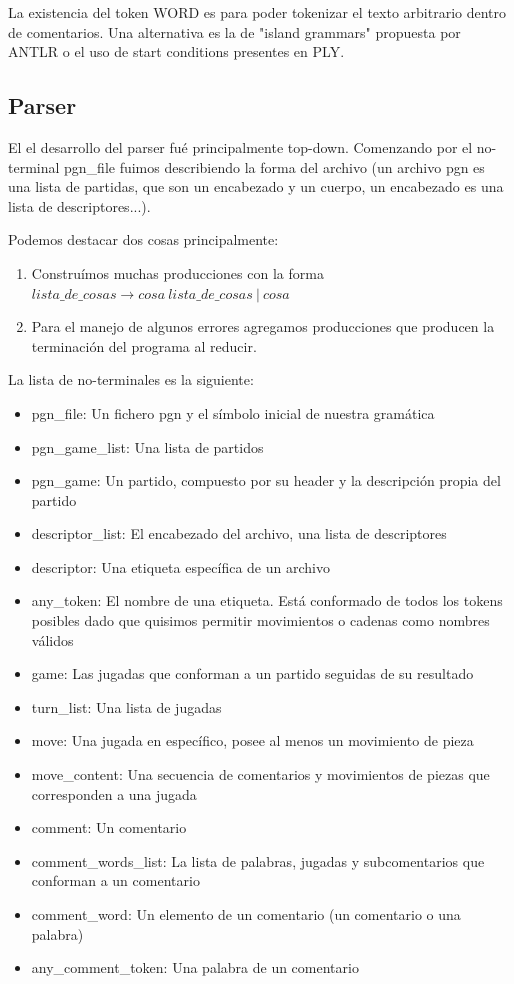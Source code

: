 La existencia del token WORD es para poder tokenizar el texto arbitrario dentro de comentarios. Una alternativa es la de "island grammars" propuesta por ANTLR o el uso de start conditions presentes en PLY.

\subsection{Parser}

El el desarrollo del parser fué principalmente top-down. Comenzando por el no-terminal pgn\_file fuimos describiendo la forma del archivo (un archivo pgn es una lista de partidas, que son un encabezado y un cuerpo, un encabezado es una lista de descriptores...).

Podemos destacar dos cosas principalmente:

\begin{enumerate}
    \item Construímos muchas producciones con la forma $lista\_de\_cosas \rightarrow cosa\ lista\_de\_cosas\ |\ cosa$
    \item Para el manejo de algunos errores agregamos producciones que producen la terminación del programa al reducir.
\end{enumerate}

La lista de no-terminales es la siguiente:

  \begin{itemize}
    \item pgn\_file: Un fichero pgn y el símbolo inicial de nuestra gramática
    \item pgn\_game\_list: Una lista de partidos
    \item pgn\_game: Un partido, compuesto por su header y la descripción propia del partido
    \item descriptor\_list: El encabezado del archivo, una lista de descriptores
    \item descriptor: Una etiqueta específica de un archivo
    \item any\_token: El nombre de una etiqueta. Está conformado de todos los tokens posibles dado que quisimos permitir movimientos o cadenas como nombres válidos
    \item game: Las jugadas que conforman a un partido seguidas de su resultado
    \item turn\_list: Una lista de jugadas
    \item move: Una jugada en específico, posee al menos un movimiento de pieza
    \item move\_content: Una secuencia de comentarios y movimientos de piezas que corresponden a una jugada
    \item comment: Un comentario
    \item comment\_words\_list: La lista de palabras, jugadas y subcomentarios que conforman a un comentario
    \item comment\_word: Un elemento de un comentario (un comentario o una palabra)
    \item any\_comment\_token: Una palabra de un comentario
\end{itemize}  

